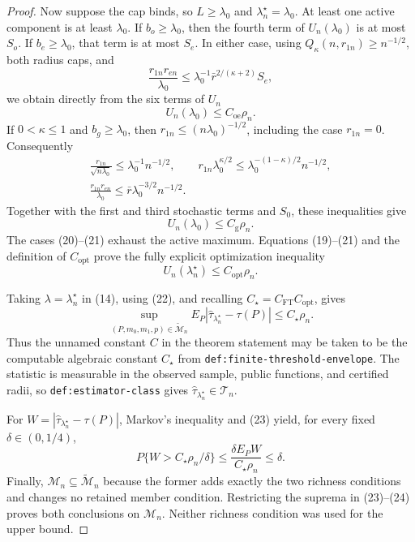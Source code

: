 \documentclass{article}
\begin{document}
\begin{proof}
Now suppose the cap binds, so \(L\geq\lambda_0\) and
\(\lambda_n^\star=\lambda_0\).  At least one active component is at least
\(\lambda_0\).  If \(b_o\geq\lambda_0\), then the fourth term of
\(U_n(\lambda_0)\) is at most \(S_o\).  If
\(b_e\geq\lambda_0\), that term is at most \(S_e\).  In either case,
using \(Q_\kappa(n,r_{1n})\geq n^{-1/2}\), both radius caps, and
\[
\frac{r_{1n}r_{en}}{\lambda_0}
\leq\lambda_0^{-1}\bar r^{2/(\kappa+2)}S_e,
\]
we obtain directly from the six terms of \(U_n\)
\[
U_n(\lambda_0)\leq C_{\mathrm{oe}}\rho_n.                           \tag{20}
\]
If \(0<\kappa\leq1\) and \(b_g\geq\lambda_0\), then
\(r_{1n}\leq(n\lambda_0)^{-1/2}\), including the case \(r_{1n}=0\).
Consequently
\[
\begin{gathered}
\frac{r_{1n}}{\sqrt{n\lambda_0}}
\leq\lambda_0^{-1}n^{-1/2},\qquad
r_{1n}\lambda_0^{\kappa/2}
\leq\lambda_0^{-(1-\kappa)/2}n^{-1/2},\\
\frac{r_{1n}r_{en}}{\lambda_0}
\leq\bar r\lambda_0^{-3/2}n^{-1/2}.
\end{gathered}
\]
Together with the first and third stochastic terms and \(S_0\), these
inequalities give
\[
U_n(\lambda_0)\leq C_{\mathrm g}\rho_n.                            \tag{21}
\]
The cases (20)--(21) exhaust the active maximum.  Equations (19)--(21) and the
definition of \(C_{\mathrm{opt}}\) prove the fully explicit optimization
inequality
\[
U_n(\lambda_n^\star)\leq C_{\mathrm{opt}}\rho_n.                    \tag{22}
\]

Taking \(\lambda=\lambda_n^\star\) in (14), using (22), and recalling
\(C_\star=C_{\mathrm{FT}}C_{\mathrm{opt}}\), gives
\[
\sup_{(P,m_0,m_1,p)\in\widetilde{\mathcal M}_n}
E_P|\widehat\tau_{\lambda_n^\star}-\tau(P)|
\leq C_\star\rho_n.                                               \tag{23}
\]
Thus the unnamed constant \(C\) in the theorem statement may be taken to be
the computable algebraic constant \(C_\star\) from
\texttt{def:finite-threshold-envelope}.  The statistic is measurable in the
observed sample, public functions, and certified radii, so
\texttt{def:estimator-class} gives
\(\widehat\tau_{\lambda_n^\star}\in\mathcal T_n\).

For \(W=|\widehat\tau_{\lambda_n^\star}-\tau(P)|\), Markov's inequality and
(23) yield, for every fixed \(\delta\in(0,1/4)\),
\[
P\{W>C_\star\rho_n/\delta\}
\leq\frac{\delta E_PW}{C_\star\rho_n}\leq\delta.                   \tag{24}
\]
Finally, \(\mathcal M_n\subseteq\widetilde{\mathcal M}_n\) because the former
adds exactly the two richness conditions and changes no retained member
condition.  Restricting the suprema in (23)--(24) proves both conclusions on
\(\mathcal M_n\).  Neither richness condition was used for the upper bound.
\end{proof}
\end{document}
